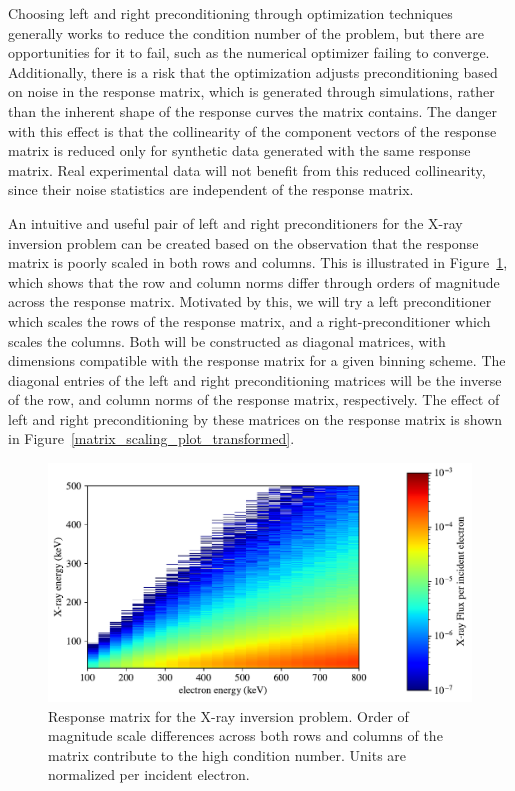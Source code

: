 Choosing left and right preconditioning through optimization techniques generally works to reduce the condition number of the problem, but there are opportunities for it to fail, such as the numerical optimizer failing to converge. Additionally, there is a risk that the optimization adjusts preconditioning based on noise in the response matrix, which is generated through simulations, rather than the inherent shape of the response curves the matrix contains. The danger with this effect is that the collinearity of the component vectors of the response matrix is reduced only for synthetic data generated with the same response matrix. Real experimental data will not benefit from this reduced collinearity, since their noise statistics are independent of the response matrix. 

An intuitive and useful pair of left and right preconditioners for the X-ray inversion problem can be created based on the observation that the response matrix is poorly scaled in both rows and columns. This is illustrated in Figure~\ref{matrix_scaling_plot}, which shows that the row and column norms differ through orders of magnitude across the response matrix. Motivated by this, we will try a left preconditioner which scales the rows of the response matrix, and a right-preconditioner which scales the columns. Both will be constructed as diagonal matrices, with dimensions compatible with the response matrix for a given binning scheme. The diagonal entries of the left and right preconditioning matrices will be the inverse of the row, and column norms of the response matrix, respectively. The effect of left and right preconditioning by these matrices on the response matrix is shown in Figure~\ref{matrix_scaling_plot_transformed}.

\begin{figure}[p]
    \centering
    \includegraphics[width=\textwidth]{figures/chapter_4/matrix_scaling_plot/matrix_scaling_plot_vanilla2.pdf}
    \caption{Response matrix for the X-ray inversion problem. Order of magnitude scale differences across both rows and columns of the matrix contribute to the high condition number. Units are normalized per incident electron.}
    \label{matrix_scaling_plot}
\end{figure}

